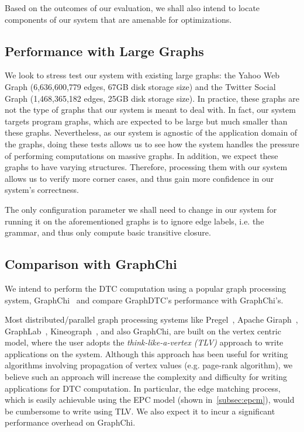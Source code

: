 \documentclass[10pt,preprint]{sigplanconf}
\begin{document}
Based on the outcomes of our evaluation, we shall also intend to locate components of our system that are amenable for optimizations. 

\subsection{Performance with Large Graphs}
\label{subsec:lgperf}

We look to stress test our system with existing large graphs: the Yahoo Web Graph (6,636,600,779 edges, 67GB disk storage size) and the Twitter Social Graph (1,468,365,182 edges, 25GB disk storage size). In practice, these graphs are not the type of graphs that our system is meant to deal with. In fact, our system targets program graphs, which are expected to be large but much smaller than these graphs. Nevertheless, as our system is agnostic of the application domain of the graphs, doing these tests allows us to see how the system handles the pressure of performing computations on massive graphs. In addition, we expect these graphs to have varying structures. Therefore, processing them with our system allows us to verify more corner cases, and thus gain more confidence in our system's correctness. 

The only configuration parameter we shall need to change in our system for running it on the aforementioned graphs is to ignore edge labels, i.e. the grammar, and thus only compute basic transitive closure. 

\subsection{Comparison with GraphChi}
\label{subsec:gchicomp}

We intend to perform the DTC computation using a popular graph processing system, GraphChi~\cite{graphchi} and compare GraphDTC's performance with GraphChi's. 

Most distributed/parallel graph processing systems like Pregel~\cite{pregel}, Apache Giraph~\cite{giraph}, GraphLab~\cite{glab}, Kineograph~\cite{kg}, and also GraphChi, are built on the vertex centric model, where the user adopts the \textit{think-like-a-vertex (TLV)} approach to write applications on the system. Although this approach has been useful for writing algorithms involving propagation of vertex values (e.g. page-rank algorithm), we believe such an approach will increase the complexity and difficulty for writing applications for DTC computation. In particular, the edge matching process, which is easily achievable using the EPC model (shown in~\ref{subsec:epcm}), would be cumbersome to write using TLV. We also expect it to incur a significant performance overhead on GraphChi. 
\end{document}
